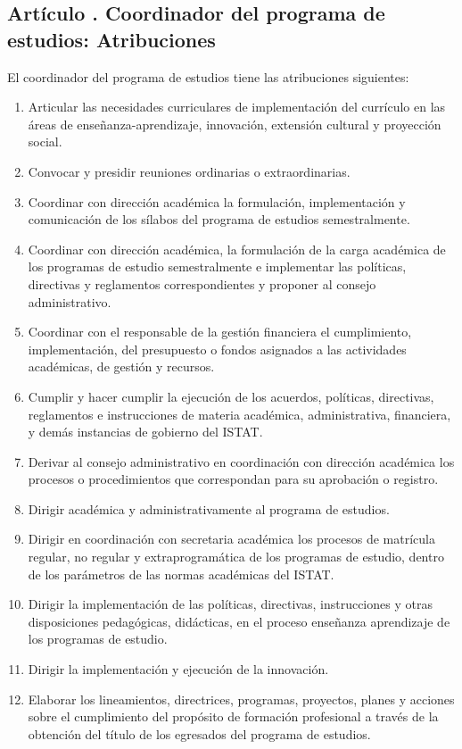 \subsection{Artículo . Coordinador del programa de estudios: Atribuciones}
\addtocounter{ns}{1}
El coordinador del programa de estudios tiene las atribuciones siguientes: 
\begin{enumerate}
\item Articular las necesidades curriculares de implementación del currículo en las áreas de enseñanza-aprendizaje, innovación, extensión cultural y proyección social. 
\item Convocar y presidir reuniones ordinarias o extraordinarias.
\item Coordinar con dirección académica la formulación, implementación y comunicación de los sílabos del programa de estudios semestralmente. 
\item Coordinar con dirección académica, la formulación de la carga académica de los programas de estudio semestralmente e implementar las políticas, directivas y reglamentos correspondientes y proponer al consejo administrativo. 
\item Coordinar con el responsable de la gestión financiera el cumplimiento, implementación, del presupuesto o fondos asignados a las actividades académicas, de gestión y recursos. 
\item Cumplir y hacer cumplir la ejecución de los acuerdos, políticas, directivas, reglamentos e instrucciones de materia académica, administrativa, financiera, y demás instancias de gobierno del ISTAT. 
\item Derivar al consejo administrativo en coordinación con dirección académica los procesos o procedimientos que correspondan para su aprobación o registro. 
\item Dirigir académica y administrativamente al programa de estudios. 
\item Dirigir en coordinación con secretaria académica los procesos de matrícula regular, no regular y extraprogramática  de los programas de estudio, dentro de los parámetros de las normas académicas del ISTAT. 
\item Dirigir la implementación de las políticas, directivas, instrucciones y otras disposiciones pedagógicas, didácticas, en el proceso enseñanza aprendizaje de los programas de estudio. 
\item Dirigir la implementación y ejecución de la innovación. 
\item Elaborar los lineamientos, directrices, programas, proyectos, planes y acciones sobre el cumplimiento del propósito de formación profesional a través de la obtención del título de los egresados del programa de estudios. 

\end{enumerate}
